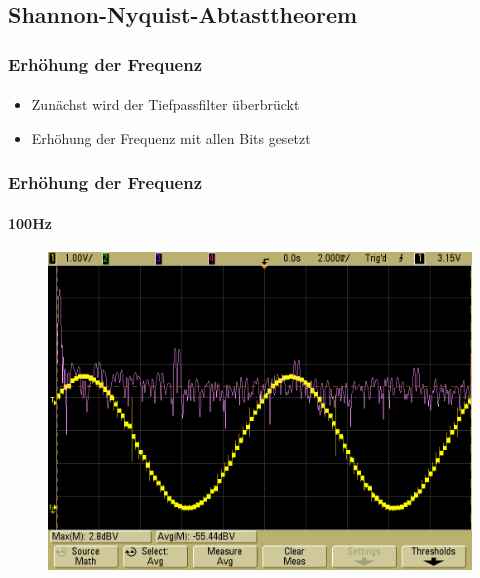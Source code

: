 \subsection{Shannon-Nyquist-Abtasttheorem} %
\label{sub:Shannon-Nyquist-Abtasttheorem}

\begin{frame}
    \frametitle{Erhöhung der Frequenz}
    \framesubtitle{}
     \begin{block}{}
         \begin{itemize}
             \item Zunächst wird der Tiefpassfilter überbrückt
             \item Erhöhung der Frequenz mit allen Bits gesetzt
         \end{itemize}
     \end{block}
\end{frame}
\begin{frame}
    \frametitle{Erhöhung der Frequenz}
    \framesubtitle{100Hz}
            \begin{figure}[H]
            \begin{center}
                    \includegraphics[scale=0.2]{./img/oszi/scope_21.png}
            \end{center}
            \end{figure}
\end{frame}
